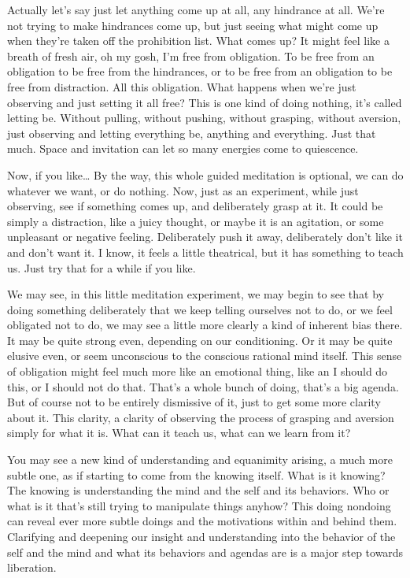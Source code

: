 \documentclass[12pt,openany]{book}
\begin{document}
Actually let's say just let anything come up at all, any hindrance at all. We're not trying to make hindrances come up, but just seeing what might come up when they’re taken off the prohibition list. What comes up? It might feel like a breath of fresh air, oh my gosh, I'm free from obligation. To be free from an obligation to be free from the hindrances, or to be free from an obligation to be free from distraction. All this obligation. What happens when we're just observing and just setting it all free? This is one kind of doing nothing, it’s called letting be. Without pulling, without pushing, without grasping, without aversion, just observing and letting everything be, anything and everything. Just that much. Space and invitation can let so many energies come to quiescence.

Now, if you like… By the way, this whole guided meditation is optional, we can do whatever we want, or do nothing. Now, just as an experiment, while just observing, see if something comes up, and deliberately grasp at it. It could be simply a distraction, like a juicy thought, or maybe it is an agitation, or some unpleasant or negative feeling. Deliberately push it away, deliberately don’t like it and don't want it. I know, it feels a little theatrical, but it has something to teach us. Just try that for a while if you like.

We may see, in this little meditation experiment, we may begin to see that by doing something deliberately that we keep tel\-ling ourselves not to do, or we feel obligated not to do, we may see a little more clearly a kind of inherent bias there. It may be quite strong even, depending on our conditioning. Or it may be quite elusive even, or seem unconscious to the conscious rational mind itself. This sense of obligation might feel much more like an emotional thing, like an I should do this, or I should not do that. That's a whole bunch of doing, that's a big agenda. But of course not to be entirely dismissive of it, just to get some more clarity about it. This clarity, a clarity of observing the process of grasping and aversion simply for what it is. What can it teach us, what can we learn from it?

You may see a new kind of understanding and equanimity arising, a much more subtle one, as if starting to come from the knowing itself. What is it knowing? The knowing is understanding the mind and the self and its behaviors. Who or what is it that's still trying to manipulate things anyhow? This doing nondoing can reveal ever more subtle doings and the motivations within and behind them. Clarifying and deepening our insight and understanding into the behavior of the self and the mind and what its behaviors and agendas are is a major step towards liberation. 
\end{document}

